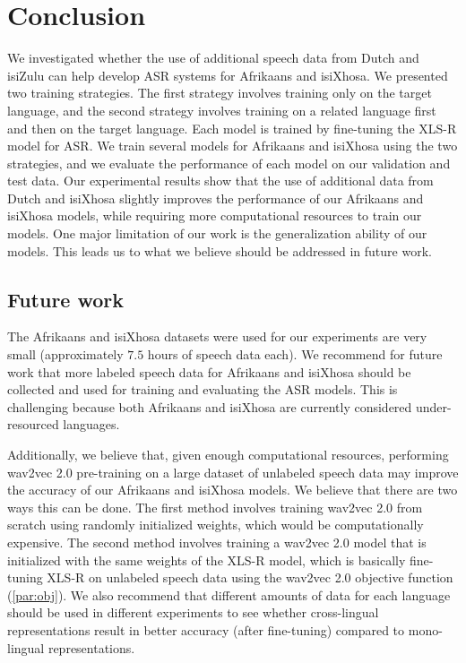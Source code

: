 \graphicspath{{conclusion/fig/}}

\chapter{Conclusion} \label{chap:conclusion}
We investigated whether the use of additional speech data from Dutch and isiZulu can help develop ASR systems for Afrikaans and isiXhosa.
We presented two training strategies. The first strategy involves training only on the target language, and the second strategy 
involves training on a related language first and then on the target language. Each model is trained by fine-tuning the XLS-R model for ASR.
We train several models for Afrikaans and isiXhosa using the two strategies, and we evaluate the performance of each model on our validation and test data.
Our experimental results show that the use of additional data from Dutch and isiXhosa slightly improves the performance
of our Afrikaans and isiXhosa models, while requiring more computational resources to train our models.
One major limitation of our work is the generalization ability of our models. This leads us to what we believe should be addressed in future work.

\section{Future work}
The Afrikaans and isiXhosa datasets were used for our experiments are very small (approximately $7.5$ hours of speech data each).
We recommend for future work that more labeled speech data for Afrikaans and isiXhosa should be collected and used for training and evaluating the ASR models.
This is challenging because both Afrikaans and isiXhosa are currently considered under-resourced languages.

Additionally, we believe that, given enough computational resources, performing wav2vec 2.0 pre-training on a large dataset of unlabeled speech data may improve the accuracy of our Afrikaans and isiXhosa models.
We believe that there are two ways this can be done. 
The first method involves training wav2vec 2.0 from scratch using randomly initialized weights, which would be computationally expensive.
The second method involves training a wav2vec 2.0 model that is initialized with the same weights of the XLS-R model, 
which is basically fine-tuning XLS-R on unlabeled speech data using the wav2vec 2.0 objective function (\ref{par:obj}).
We also recommend that different amounts of data for each language should be used in different experiments to see whether cross-lingual
representations result in better accuracy (after fine-tuning) compared to mono-lingual representations.